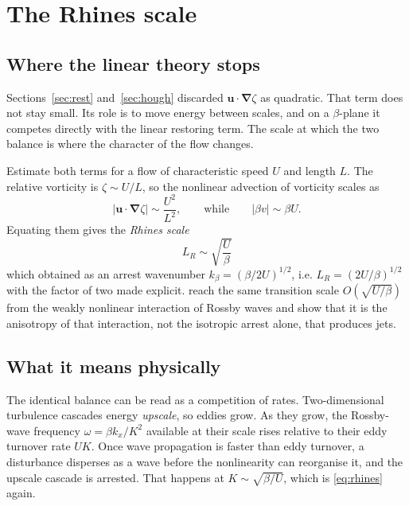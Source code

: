 \documentclass[11pt,a4paper]{article}
\newcommand{\uvec}{\boldsymbol{u}}
\newcommand{\grad}{\boldsymbol{\nabla}}
\begin{document}
\section{The Rhines scale}
\label{sec:rhines}

\subsection{Where the linear theory stops}

Sections~\ref{sec:rest} and~\ref{sec:hough} discarded $\uvec\!\cdot\!\grad\zeta$
as quadratic. That term does not stay small. Its role is to move energy between
scales, and on a $\beta$-plane it competes directly with the linear restoring
term. The scale at which the two balance is where the character of the flow
changes.

Estimate both terms for a flow of characteristic speed $U$ and length $L$. The
relative vorticity is $\zeta \sim U/L$, so the nonlinear advection of vorticity
scales as
%
\begin{equation}
|\uvec\!\cdot\!\grad\zeta| \sim \frac{U^2}{L^2} ,
\qquad\text{while}\qquad
|\beta v| \sim \beta U .
\label{eq:rhinesscaling}
\end{equation}
%
Equating them gives the \emph{Rhines scale}
%
\begin{equation}
\boxed{\;L_R \sim \sqrt{\frac{U}{\beta}}\;}
\label{eq:rhines}
\end{equation}
%
which \citet{rhines1975} obtained as an arrest wavenumber
$k_\beta = (\beta/2U)^{1/2}$, i.e. $L_R = (2U/\beta)^{1/2}$ with the factor of
two made explicit. \citet{vallis1993} reach the same transition scale
$O(\sqrt{U/\beta})$ from the weakly nonlinear interaction of Rossby waves and
show that it is the anisotropy of that interaction, not the isotropic arrest
alone, that produces jets.

\subsection{What it means physically}

The identical balance can be read as a competition of rates. Two-dimensional
turbulence cascades energy \emph{upscale}, so eddies grow. As they grow, the
Rossby-wave frequency $\omega = \beta k_x/K^2$ available at their scale rises
relative to their eddy turnover rate $UK$. Once wave propagation is faster than
eddy turnover, a disturbance disperses as a wave before the nonlinearity can
reorganise it, and the upscale cascade is arrested. That happens at
$K \sim \sqrt{\beta/U}$, which is \eqref{eq:rhines} again.
\end{document}

